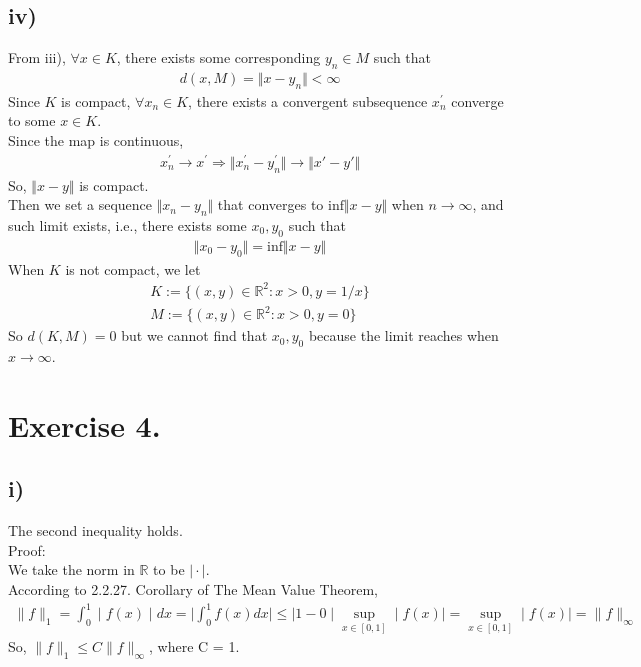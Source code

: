 \documentclass{article}
\begin{document}
\subsection*{iv)}
From iii), $\forall x\in K$, there exists some corresponding $y_n\in M $ such that
\begin{align*}
d(x,M)=\Vert x-y_n\Vert<\infty
\end{align*}
Since $K$ is compact, $\forall x_n\in K $, there exists a convergent subsequence $x_n^{'}$ converge to some $x\in K$.\\
Since the map is continuous,
\begin{align*}
x_n^{'}\rightarrow x^{'} \Rightarrow \Vert x_n^{'}-y_n^{'}\Vert\rightarrow \Vert x{'}-y{'}\Vert
\end{align*}
So, $\Vert x-y\Vert$ is compact.\\
Then we set a sequence $\Vert x_n-y_n\Vert$ that converges to $\mathrm{inf}\Vert x-y\Vert$ when $n\rightarrow \infty$, and such limit exists, i.e., there exists some $x_0,y_0$ such that
\begin{align*}
\Vert x_0-y_0\Vert = \mathrm{inf}\Vert x-y\Vert
\end{align*} 
When $K$ is not compact, we let
\begin{align*}
K:=\lbrace (x,y)\in \mathbb{R}^2:x>0,y=1/x\rbrace\\ 
M:=\lbrace (x,y)\in \mathbb{R}^2:x>0,y=0\rbrace
\end{align*}
So $d(K,M)=0$ but we cannot find that $x_0,y_0$ because the limit reaches when $x\rightarrow\infty$.




\section*{Exercise 4.}
\subsection*{i)}
The second inequality holds.\\
Proof:\\
We take the norm in $\mathbb{R}$ to be $\mid \cdot\mid$.\\
According to 2.2.27. Corollary of The Mean Value Theorem,
\begin{align*}
\parallel f\parallel_1=\int^1_0\mid f(x)\mid dx=\mid \int^1_0 f(x)dx\mid\leq\mid1-0\mid\mathop{sup}_{x\in[0,1]}\mid f(x)\mid=\mathop{sup}_{x\in[0,1]}\mid f(x)\mid=\parallel f\parallel_\infty
\end{align*}
So, $\parallel f\parallel_1\leq C\parallel f\parallel_\infty$, where C = 1.
\end{document}
